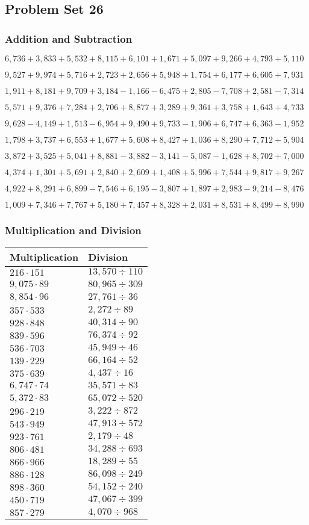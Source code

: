 \hypertarget{problem-set-26-3}{%
\subsection{Problem Set 26}\label{problem-set-26-3}}

\hypertarget{addition-and-subtraction-188}{%
\subsubsection{Addition and
Subtraction}\label{addition-and-subtraction-188}}

\(6,736+3,833+5,532+8,115+6,101+1,671+5,097+9,266+4,793+ 5,110\)

\(9,527+9,974+5,716+2,723+2,656+5,948+1,754+6,177+6,605+7,931\)

\(1,911+8,181+9,709+3,184-1,166-6,475+2,805-7,708+2,581-7,314\)

\(5,571+9,376+7,284+2,706+8,877+3,289+9,361+3,758+1,643+4,733\)

\(9,628-4,149+1,513-6,954+9,490+9,733-1,906+6,747+6,363-1,952\)

\(1,798+3,737+6,553+1,677+5,608+8,427+1,036+8,290+7,712+5,904\)

\(3,872+3,525+5,041+8,881-3,882-3,141-5,087-1,628+8,702+7,000\)

\(4,374+1,301+5,691+2,840+2,609+1,408+5,996+7,544+9,817+9,267\)

\(4,922+8,291+6,899-7,546+6,195-3,807+1,897+2,983-9,214-8,476\)

\(1,009+7,346+7,767+5,180+7,457+8,328+2,031+8,531+8,499+8,990\)

\hypertarget{multiplication-and-division-187}{%
\subsubsection{Multiplication and
Division}\label{multiplication-and-division-187}}

\begin{longtable}[]{@{}ll@{}}
\toprule
Multiplication & Division\tabularnewline
\midrule
\endhead
\(216\cdot151\) & \(13,570÷110\)\tabularnewline
\(9,075\cdot89\) & \(80,965÷309\)\tabularnewline
\(8,854\cdot96\) & \(27,761÷36\)\tabularnewline
\(357\cdot533\) & \(2,272÷89\)\tabularnewline
\(928\cdot848\) & \(40,314÷90\)\tabularnewline
\(839\cdot596\) & \(76,374÷92\)\tabularnewline
\(536\cdot703\) & \(45,949÷46\)\tabularnewline
\(139\cdot229\) & \(66,164÷52\)\tabularnewline
\(375\cdot639\) & \(4,437÷16\)\tabularnewline
\(6,747\cdot74\) & \(35,571÷83\)\tabularnewline
\(5,372\cdot83\) & \(65,072÷520\)\tabularnewline
\(296\cdot219\) & \(3,222÷872\)\tabularnewline
\(543\cdot949\) & \(47,913÷572\)\tabularnewline
\(923\cdot761\) & \(2,179÷48\)\tabularnewline
\(806\cdot481\) & \(34,288÷693\)\tabularnewline
\(866\cdot966\) & \(18,289÷55\)\tabularnewline
\(886\cdot128\) & \(86,098÷249\)\tabularnewline
\(898\cdot360\) & \(54,152÷240\)\tabularnewline
\(450\cdot719\) & \(47,067÷399\)\tabularnewline
\(857\cdot279\) & \(4,070÷968\)\tabularnewline
\bottomrule
\end{longtable}

